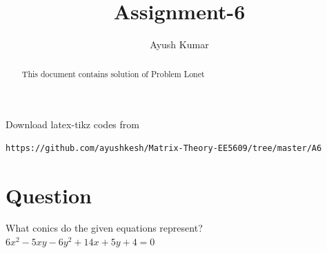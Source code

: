 \documentclass[journal,12pt,twocolumn]{IEEEtran}
\begin{document}
\makeatletter
{}
\makeatother
\let\StandardTheFigure\thefigure
\let\vec\mathbf
\renewcommand{\thefigure}{\theproblem}
\def\putbox#1#2#3{\makebox[0in][l]{\makebox[#1][l]{}\raisebox{\baselineskip}[0in][0in]{\raisebox{#2}[0in][0in]{#3}}}}
     \def\rightbox#1{\makebox[0in][r]{#1}}
     \def\centbox#1{\makebox[0in]{#1}}
     \def\topbox#1{\raisebox{-\baselineskip}[0in][0in]{#1}}
\vspace{3cm}
\title{Assignment-6\\}
\author{Ayush Kumar}
\maketitle
\newpage
\bigskip
\renewcommand{\thefigure}{\theenumi}
\renewcommand{\thetable}{\theenumi}
\begin{abstract}
This document contains solution of Problem Lonet
\end{abstract}
Download latex-tikz codes from 
%
\begin{lstlisting}
https://github.com/ayushkesh/Matrix-Theory-EE5609/tree/master/A6
\end{lstlisting}
\section{\textbf{Question}}
What conics do the given equations represent?\\
$6x^2-5xy-6y^2+14x+5y+4=0$
\end{document}
